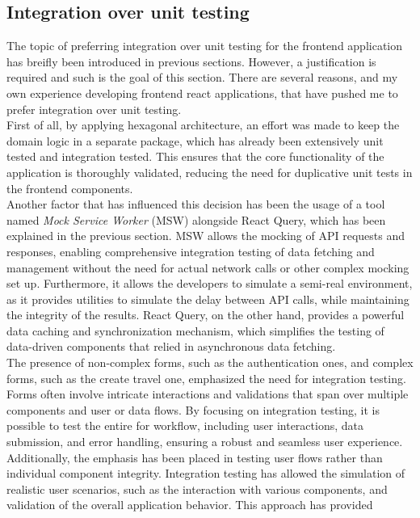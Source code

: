 \documentclass[./memory.tex]{subfiles}
\begin{document}
\subsection{Integration over unit testing}
The topic of preferring integration over unit testing for the frontend
application has breifly been introduced in previous sections. However, a
justification is required and such is the goal of this section. There are
several reasons, and my own experience developing frontend react applications,
that have pushed me to prefer integration over unit testing.
\\[8pt]
First of all, by applying hexagonal architecture, an effort was made to keep the
domain logic in a separate package, which has already been extensively unit
tested and integration tested. This ensures that the core functionality of the
application is thoroughly validated, reducing the need for duplicative unit
tests in the frontend components.
\\[8pt]
Another factor that has influenced this decision has been the usage of a tool
named \emph{Mock Service Worker} (MSW) alongside React Query, which has been
explained in the previous section. MSW allows the mocking of API requests and
responses, enabling comprehensive integration testing of data fetching and
management without the need for actual network calls or other complex mocking
set up. Furthermore, it allows the developers to simulate a semi-real
environment, as it provides utilities to simulate the delay between API calls,
while maintaining the integrity of the results. React Query, on the other hand,
provides a powerful data caching and synchronization mechanism, which simplifies
the testing of data-driven components that relied in asynchronous data fetching.
\\[8pt]
The presence of non-complex forms, such as the authentication ones, and complex
forms, such as the create travel one, emphasized the need for integration
testing. Forms often involve intricate interactions and validations that span
over multiple components and user or data flows. By focusing on integration
testing, it is possible to test the entire for workflow, including user
interactions, data submission, and error handling, ensuring a robust and
seamless user experience.
\\[8pt]
Additionally, the emphasis has been placed in testing user flows rather than
individual component integrity. Integration testing has allowed the simulation
of realistic user scenarios, such as the interaction with various components,
and validation of the overall application behavior. This approach has provided
\end{document}
